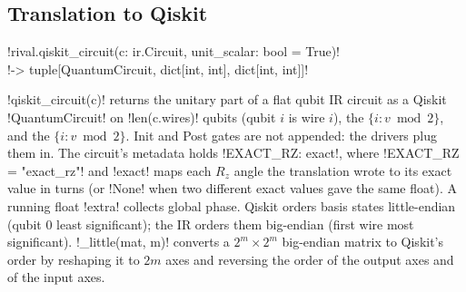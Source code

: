 \subsection{Translation to Qiskit}\label{sec:bench-tools-qiskit-circuit}

\begin{signature}
\py!rival.qiskit_circuit(c: ir.Circuit, unit_scalar: bool = True)!\\
\quad\py!-> tuple[QuantumCircuit, dict[int, int], dict[int, int]]!
\end{signature}

\py!qiskit_circuit(c)! returns the unitary part of a flat qubit IR circuit as a Qiskit \py!QuantumCircuit! on \py!len(c.wires)! qubits (qubit $i$ is wire $i$), the  $\{i: v\bmod 2\}$, and the  $\{i: v\bmod 2\}$. Init and Post gates are not appended: the drivers plug them in. The circuit's metadata holds \py!{EXACT_RZ: exact}!, where \py!EXACT_RZ = "exact_rz"! and \py!exact! maps each $R_z$ angle the translation wrote to its exact value in turns (or \py!None! when two different exact values gave the same float). A running float \py!extra! collects global phase. Qiskit orders basis states little-endian (qubit $0$ least significant); the IR orders them big-endian (first wire most significant). \py!_little(mat, m)! converts a $2^m\times2^m$ big-endian matrix to Qiskit's order by reshaping it to $2m$ axes and reversing the order of the output axes and of the input axes.

